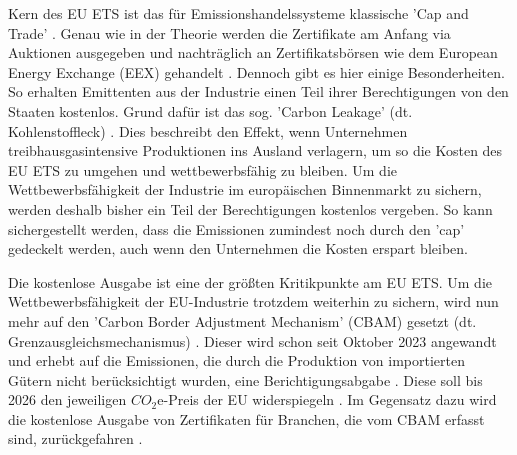 Kern des EU ETS ist das für Emissionshandelssysteme klassische 'Cap and Trade' \cite{eu.2023}. Genau wie in der Theorie werden die Zertifikate am Anfang via Auktionen ausgegeben und nachträglich an Zertifikatsbörsen wie dem European Energy Exchange (EEX) gehandelt \cite[S. 186]{hubert.2020} \cite{eu.2024}.
Dennoch gibt es hier einige Besonderheiten. So erhalten Emittenten aus der Industrie einen Teil ihrer Berechtigungen von den Staaten kostenlos.
Grund dafür ist das sog. 'Carbon Leakage' (dt. Kohlenstoffleck) \cite{eu2.2023}.
Dies beschreibt den Effekt, wenn Unternehmen treibhausgasintensive Produktionen ins Ausland verlagern, um so die Kosten des EU ETS zu umgehen und wettbewerbsfähig zu bleiben.
Um die Wettbewerbsfähigkeit der Industrie im europäischen Binnenmarkt zu sichern, werden deshalb bisher ein Teil der Berechtigungen kostenlos vergeben.
So kann sichergestellt werden, dass die Emissionen zumindest noch durch den 'cap' gedeckelt werden, auch wenn den Unternehmen die Kosten erspart bleiben.

Die kostenlose Ausgabe ist eine der größten Kritikpunkte am EU ETS. Um die Wettbewerbsfähigkeit der EU-Industrie trotzdem weiterhin zu sichern, wird nun mehr auf den 'Carbon Border Adjustment Mechanism' (CBAM) gesetzt (dt. Grenzausgleichsmechanismus) \cite{ub.2023}.
Dieser wird schon seit Oktober 2023 angewandt und erhebt auf die Emissionen, die durch die Produktion von importierten Gütern nicht berücksichtigt wurden, eine Berichtigungsabgabe \cite{ub2.2023}.
Diese soll bis 2026 den jeweiligen $CO_2$e-Preis der EU widerspiegeln \cite{ub.2023}.
Im Gegensatz dazu wird die kostenlose Ausgabe von Zertifikaten für Branchen, die vom CBAM erfasst sind, zurückgefahren \cite{ub.2023}.

